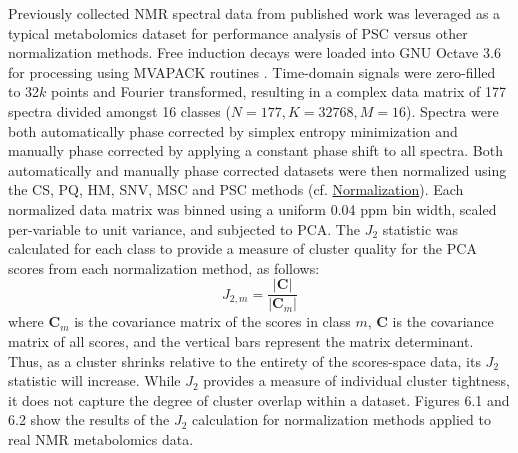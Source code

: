 \begin{doublespace}
Previously collected \hnmr{} NMR spectral data from published work
\cite{halouska:acscb2012} was leveraged as a typical metabolomics dataset
for performance analysis of PSC versus other normalization methods. Free
induction decays were loaded into GNU Octave 3.6 \cite{eaton2008} for
processing using MVAPACK routines \cite{worley:acscb2014}. Time-domain signals
were zero-filled to 32$k$ points and Fourier transformed, resulting in
a complex data matrix of 177 spectra divided amongst 16 classes
($N = 177, K = 32768, M = 16$). Spectra were both automatically phase corrected
by simplex entropy minimization \cite{chen:jmr2002} and manually phase
corrected by applying a constant phase shift to all spectra. Both automatically
and manually phase corrected datasets were then normalized using the CS, PQ,
HM, SNV, MSC and PSC methods (cf. \hyperlink{subsection.3.4.3}{Normalization}).
Each normalized data matrix was binned using a uniform 0.04 ppm bin width,
scaled per-variable to unit variance, and subjected to PCA. The $J_2$ statistic
\cite{koutroumbas2006} was calculated for each class to provide a measure of
cluster quality for the PCA scores from each normalization method, as follows:
\begin{equation}
J_{2,m} = \frac{|\mathbf{C}|}{|\mathbf{C}_m|}
\end{equation}
where $\mathbf{C}_m$ is the covariance matrix of the scores in class $m$,
$\mathbf{C}$ is the covariance matrix of all scores, and the vertical bars
represent the matrix determinant. Thus, as a cluster shrinks relative to the
entirety of the scores-space data, its $J_2$ statistic will increase. While
$J_2$ provides a measure of individual cluster tightness, it does not capture
the degree of cluster overlap within a dataset. Figures 6.1 and 6.2 show the
results of the $J_2$ calculation for normalization methods applied to real
\hnmr{} NMR metabolomics data.
\end{doublespace}

